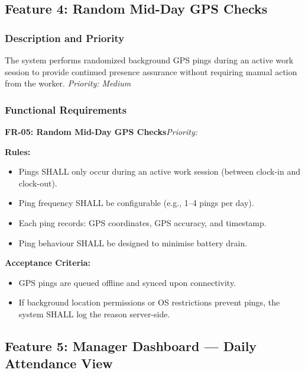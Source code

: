 \documentclass[12pt, a4paper]{article}
\newcommand{\frblock}[2]{%
    \noindent\textbf{#1}\hfill\textit{Priority: #2}%
    \par\smallskip%
}
\newcommand{\srsfield}[1]{\noindent\textbf{#1:}\par}
\begin{document}
\subsection{Feature 4: Random Mid-Day GPS Checks}

\subsubsection*{Description and Priority}
The system performs randomized background GPS pings during an active work
session to provide continued presence assurance without requiring manual
action from the worker.
\hfill \textit{Priority: Medium}

\subsubsection*{Functional Requirements}

\frblock{FR-05: Random Mid-Day GPS Checks}{}

\srsfield{Rules}
\begin{itemize}
    \item Pings SHALL only occur during an active work session
          (between clock-in and clock-out).
    \item Ping frequency SHALL be configurable (e.g., 1--4 pings per
          day).
    \item Each ping records: GPS coordinates, GPS accuracy, and timestamp.
    \item Ping behaviour SHALL be designed to minimise battery drain.
\end{itemize}

\srsfield{Acceptance Criteria}
\begin{itemize}
    \item GPS pings are queued offline and synced upon connectivity.
    \item If background location permissions or OS restrictions prevent
          pings, the system SHALL log the reason server-side.
\end{itemize}

\subsection{Feature 5: Manager Dashboard --- Daily Attendance View}
\end{document}
